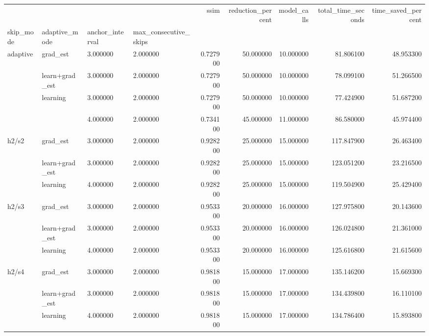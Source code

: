 \begin{tabular}{llllrrrrr}
\toprule
 &  &  &  & ssim & reduction_percent & model_calls & total_time_seconds & time_saved_percent \\
skip_mode & adaptive_mode & anchor_interval & max_consecutive_skips &  &  &  &  &  \\
\midrule
\multirow[t]{4}{*}{adaptive} & grad_est & 3.000000 & 2.000000 & 0.727900 & 50.000000 & 10.000000 & 81.806100 & 48.953300 \\
\cline{2-9} \cline{3-9}
 & learn+grad_est & 3.000000 & 2.000000 & 0.727900 & 50.000000 & 10.000000 & 78.099100 & 51.266500 \\
\cline{2-9} \cline{3-9}
 & \multirow[t]{2}{*}{learning} & 3.000000 & 2.000000 & 0.727900 & 50.000000 & 10.000000 & 77.424900 & 51.687200 \\
\cline{3-9}
 &  & 4.000000 & 2.000000 & 0.734100 & 45.000000 & 11.000000 & 86.580000 & 45.974400 \\
\cline{1-9} \cline{2-9} \cline{3-9}
\multirow[t]{3}{*}{h2/s2} & grad_est & 3.000000 & 2.000000 & 0.928200 & 25.000000 & 15.000000 & 117.847900 & 26.463400 \\
\cline{2-9} \cline{3-9}
 & learn+grad_est & 3.000000 & 2.000000 & 0.928200 & 25.000000 & 15.000000 & 123.051200 & 23.216500 \\
\cline{2-9} \cline{3-9}
 & learning & 4.000000 & 2.000000 & 0.928200 & 25.000000 & 15.000000 & 119.504900 & 25.429400 \\
\cline{1-9} \cline{2-9} \cline{3-9}
\multirow[t]{3}{*}{h2/s3} & grad_est & 3.000000 & 2.000000 & 0.953300 & 20.000000 & 16.000000 & 127.975800 & 20.143600 \\
\cline{2-9} \cline{3-9}
 & learn+grad_est & 3.000000 & 2.000000 & 0.953300 & 20.000000 & 16.000000 & 126.024800 & 21.361000 \\
\cline{2-9} \cline{3-9}
 & learning & 4.000000 & 2.000000 & 0.953300 & 20.000000 & 16.000000 & 125.616800 & 21.615600 \\
\cline{1-9} \cline{2-9} \cline{3-9}
\multirow[t]{3}{*}{h2/s4} & grad_est & 3.000000 & 2.000000 & 0.981800 & 15.000000 & 17.000000 & 135.146200 & 15.669300 \\
\cline{2-9} \cline{3-9}
 & learn+grad_est & 3.000000 & 2.000000 & 0.981800 & 15.000000 & 17.000000 & 134.439800 & 16.110100 \\
\cline{2-9} \cline{3-9}
 & learning & 4.000000 & 2.000000 & 0.981800 & 15.000000 & 17.000000 & 134.786400 & 15.893800 \\
\cline{1-9} \cline{2-9} \cline{3-9}

\end{tabular}
